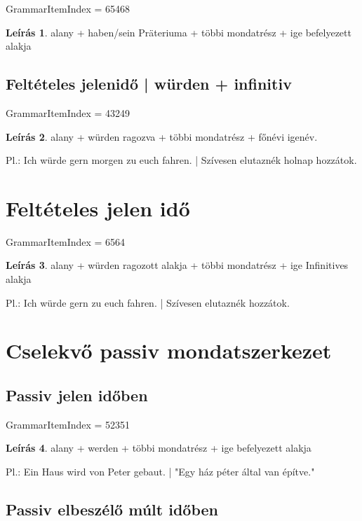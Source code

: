 \documentclass{article}
\theoremstyle{definition}
\newtheorem*{desc}{Leírás}
\begin{document}
GrammarItemIndex = 65468

\begin{desc}
alany + haben/sein Präteriuma + többi mondatrész + ige befelyezett alakja
\end{desc}

\subsection{Feltételes jelenidő | würden + infinitiv}

GrammarItemIndex = 43249

\begin{desc}
alany + würden ragozva + többi mondatrész + főnévi igenév.

Pl.: Ich würde gern morgen zu euch fahren. | Szívesen elutaznék holnap hozzátok.
\end{desc}

\section{Feltételes jelen idő}

GrammarItemIndex = 6564

\begin{desc}
alany + würden ragozott alakja + többi mondatrész + ige Infinitives alakja

Pl.: Ich würde gern zu euch fahren. | Szívesen elutaznék hozzátok.
\end{desc}

\section{Cselekvő passiv mondatszerkezet}

\subsection{Passiv jelen időben}

GrammarItemIndex = 52351

\begin{desc}
alany + werden + többi mondatrész + ige befelyezett alakja

Pl.: Ein Haus wird von Peter gebaut. | "Egy ház péter által van építve." 
\end{desc}

\subsection{Passiv elbeszélő múlt időben}
\end{document}
